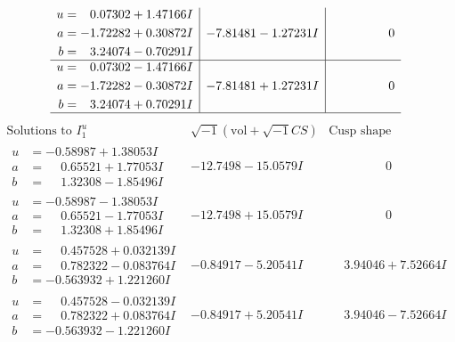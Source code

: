 \documentclass[1p]{elsarticle_modified}
\theoremstyle{definition}
\newcommand{\I}{\sqrt{-1}}
\begin{document}
$$\begin{array}{c|c|c}
\begin{aligned}
u &= \phantom{-}0.07302 + 1.47166 I \\
a &= -1.72282 + 0.30872 I \\
b &= \phantom{-}3.24074 - 0.70291 I\end{aligned}
 & -7.81481 - 1.27231 I & \phantom{-0.000000 } 0 \\ \hline\begin{aligned}
u &= \phantom{-}0.07302 - 1.47166 I \\
a &= -1.72282 - 0.30872 I \\
b &= \phantom{-}3.24074 + 0.70291 I\end{aligned}
 & -7.81481 + 1.27231 I & \phantom{-0.000000 } 0\\
 \hline 
 \end{array}$$\newpage$$\begin{array}{c|c|c}  
\text{Solutions to }I^u_{1}& \I (\text{vol} + \sqrt{-1}CS) & \text{Cusp shape}\\
 \hline 
\begin{aligned}
u &= -0.58987 + 1.38053 I \\
a &= \phantom{-}0.65521 + 1.77053 I \\
b &= \phantom{-}1.32308 - 1.85496 I\end{aligned}
 & -12.7498 - 15.0579 I & \phantom{-0.000000 } 0 \\ \hline\begin{aligned}
u &= -0.58987 - 1.38053 I \\
a &= \phantom{-}0.65521 - 1.77053 I \\
b &= \phantom{-}1.32308 + 1.85496 I\end{aligned}
 & -12.7498 + 15.0579 I & \phantom{-0.000000 } 0 \\ \hline\begin{aligned}
u &= \phantom{-}0.457528 + 0.032139 I \\
a &= \phantom{-}0.782322 - 0.083764 I \\
b &= -0.563932 + 1.221260 I\end{aligned}
 & -0.84917 - 5.20541 I & \phantom{-}3.94046 + 7.52664 I \\ \hline\begin{aligned}
u &= \phantom{-}0.457528 - 0.032139 I \\
a &= \phantom{-}0.782322 + 0.083764 I \\
b &= -0.563932 - 1.221260 I\end{aligned}
 & -0.84917 + 5.20541 I & \phantom{-}3.94046 - 7.52664 I \\ \hline\begin{aligned}

\end{aligned}
\end{array}$$
\end{document}

